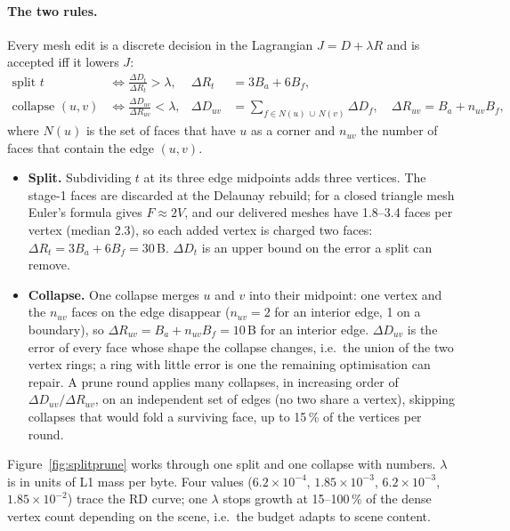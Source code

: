 \documentclass[11pt,a4paper]{article}
\begin{document}
\paragraph{The two rules.} Every mesh edit is a discrete decision in the Lagrangian $J = D + \lambda R$ and is accepted iff it lowers $J$:
\begin{align}
\text{split } t &\iff \frac{\Delta D_t}{\Delta R_t} > \lambda, & \Delta R_t &= 3B_a + 6B_f, \label{eq:split}\\
\text{collapse } (u,v) &\iff \frac{\Delta D_{uv}}{\Delta R_{uv}} < \lambda, & \Delta D_{uv} &= \sum_{f \in N(u)\,\cup\,N(v)} \Delta D_f, \quad \Delta R_{uv} = B_a + n_{uv} B_f , \label{eq:collapse}
\end{align}
where $N(u)$ is the set of faces that have $u$ as a corner and $n_{uv}$ the number of faces that contain the edge $(u,v)$.
\begin{itemize}[nosep,leftmargin=*]
  \item \textbf{Split.} Subdividing $t$ at its three edge midpoints adds three vertices. The stage-1 faces are discarded at the Delaunay rebuild; for a closed triangle mesh Euler's formula gives $F \approx 2V$, and our delivered meshes have 1.8--3.4 faces per vertex (median 2.3), so each added vertex is charged two faces: $\Delta R_t = 3B_a + 6B_f = 30$\,B. $\Delta D_t$ is an upper bound on the error a split can remove.
  \item \textbf{Collapse.} One collapse merges $u$ and $v$ into their midpoint: one vertex and the $n_{uv}$ faces on the edge disappear ($n_{uv} = 2$ for an interior edge, 1 on a boundary), so $\Delta R_{uv} = B_a + n_{uv}B_f = 10$\,B for an interior edge. $\Delta D_{uv}$ is the error of every face whose shape the collapse changes, i.e.\ the union of the two vertex rings; a ring with little error is one the remaining optimisation can repair. A prune round applies many collapses, in increasing order of $\Delta D_{uv}/\Delta R_{uv}$, on an independent set of edges (no two share a vertex), skipping collapses that would fold a surviving face, up to 15\,\% of the vertices per round.
\end{itemize}
Figure~\ref{fig:splitprune} works through one split and one collapse with numbers. $\lambda$ is in units of L1 mass per byte. Four values ($6.2\times10^{-4}$, $1.85\times10^{-3}$, $6.2\times10^{-3}$, $1.85\times10^{-2}$) trace the RD curve; one $\lambda$ stops growth at 15--100\,\% of the dense vertex count depending on the scene, i.e.\ the budget adapts to scene content.
\end{document}
